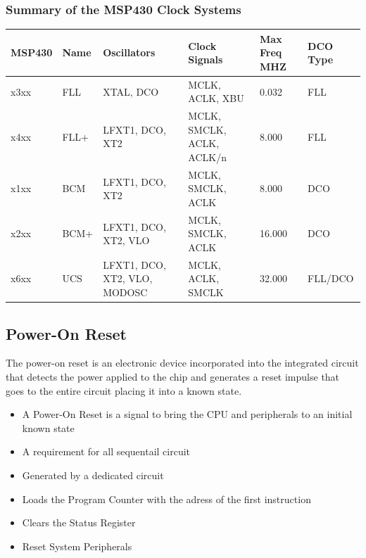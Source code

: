 \subsubsection{Summary of the MSP430 Clock Systems}
{\small 
\begin{tabular}{llllll}
    \textbf{MSP430}& \textbf{Name} & \textbf{Oscillators} & \textbf{Clock Signals} & \textbf{Max Freq MHZ} & \textbf{DCO Type} \\
    \hline
    x3xx           & FLL           & XTAL, DCO            & MCLK, ACLK, XBU        & 0.032                 & FLL                \\
    x4xx           & FLL+          & LFXT1, DCO, XT2      & MCLK, SMCLK, ACLK, ACLK/n  & 8.000             & FLL                \\
    x1xx           & BCM           & LFXT1, DCO, XT2      & MCLK, SMCLK, ACLK          & 8.000             & DCO                \\
    x2xx           & BCM+          & LFXT1, DCO, XT2, VLO & MCLK, SMCLK, ACLK          & 16.000            & DCO                \\
    x6xx           & UCS           & LFXT1, DCO, XT2, VLO, MODOSC & MCLK, ACLK, SMCLK  & 32.000            & FLL/DCO            \\
\end{tabular}
}
\subsection{Power-On Reset}
The power-on reset is an electronic device incorporated into the integrated circuit that detects the power applied to the chip and generates a reset impulse that goes to the entire circuit placing it into a known state.\\
\begin{itemize}
	\item A Power-On Reset is a signal to bring the \acs{CPU} and peripherals to an initial known state
	\item A requirement for all sequentail circuit
	\item Generated by a dedicated circuit
	\item Loads the Program Counter with the adress of the first instruction
	\item Clears the Status Register
	\item Reset System Peripherals
\end{itemize}
